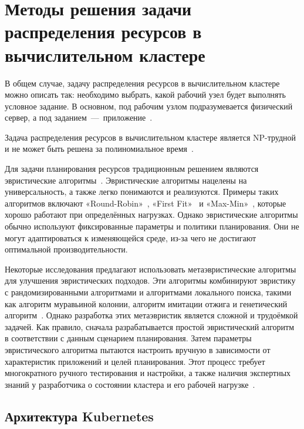 \chapter{Методы решения задачи распределения ресурсов в вычислительном кластере}

В общем случае, задачу распределения ресурсов в вычислительном кластере можно описать так: необходимо выбрать, какой рабочий узел будет выполнять условное задание. В основном, под рабочим узлом подразумевается физический сервер, а под заданием~---~приложение~\cite{bittencourt2018scheduling}.

Задача распределения ресурсов в вычислительном кластере является NP-трудной~\cite{mor2021heuristic}\cite{guo2020cloud} и не может быть решена за полиномиальное время~\cite{marrouche2024unlocking}.

Для задачи планирования ресурсов традиционным решением являются эвристические алгоритмы~\cite{marrouche2024unlocking}. Эвристические алгоритмы нацелены на универсальность, а также легко понимаются и реализуются. Примеры таких алгоритмов включают «Round-Robin»~\cite{ghazy2023ameliorated}, «First Fit»~\cite{keshri2023communication} и «Max-Min»~\cite{raeisi2024advanced}, которые хорошо работают при определённых нагрузках. Однако эвристические алгоритмы обычно используют фиксированные параметры и политики планирования. Они не могут адаптироваться к изменяющейся среде, из-за чего не достигают оптимальной производительности. 

Некоторые исследования предлагают использовать метаэвристические алгоритмы для улучшения эвристических подходов. Эти алгоритмы комбинируют эвристику с рандомизированными алгоритмами и алгоритмами локального поиска, такими как алгоритм муравьиной колонии, алгоритм имитации отжига и генетический алгоритм~\cite{mishra2024metaheuristic}. Однако разработка этих метаэвристик является сложной и трудоёмкой задачей. Как правило, сначала разрабатывается простой эвристический алгоритм в соответствии с данным сценарием планирования. Затем параметры эвристического алгоритма пытаются настроить вручную в зависимости от характеристик приложений и целей планирования. Этот процесс требует многократного ручного тестирования и настройки, а также наличия экспертных знаний у разработчика о состоянии кластера и его рабочей нагрузке~\cite{jian2024drs}.

\section{Архитектура Kubernetes}

